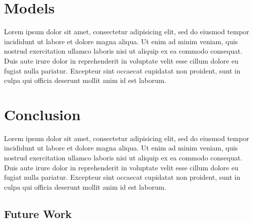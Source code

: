 \documentclass[11pt,a4paper]{article}
\begin{document}
\section{Models}

Lorem ipsum dolor sit amet, consectetur adipisicing elit, sed do eiusmod
tempor incididunt ut labore et dolore magna aliqua. Ut enim ad minim veniam,
quis nostrud exercitation ullamco laboris nisi ut aliquip ex ea commodo
consequat. Duis aute irure dolor in reprehenderit in voluptate velit esse
cillum dolore eu fugiat nulla pariatur. Excepteur sint occaecat cupidatat non
proident, sunt in culpa qui officia deserunt mollit anim id est laborum.

\section{Conclusion}

Lorem ipsum dolor sit amet, consectetur adipisicing elit, sed do eiusmod
tempor incididunt ut labore et dolore magna aliqua. Ut enim ad minim veniam,
quis nostrud exercitation ullamco laboris nisi ut aliquip ex ea commodo
consequat. Duis aute irure dolor in reprehenderit in voluptate velit esse
cillum dolore eu fugiat nulla pariatur. Excepteur sint occaecat cupidatat non
proident, sunt in culpa qui officia deserunt mollit anim id est laborum.

\subsection{Future Work}



\end{document}
